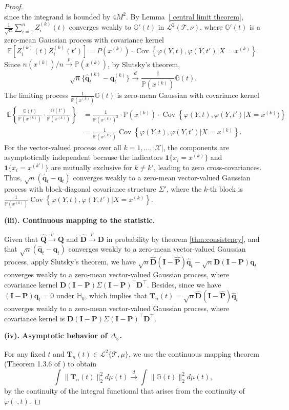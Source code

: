 \documentclass[
  12pt]{article}
\def\D{\mathbf{D}}
\def\I{\mathbf{I}}
\def\P{\mathbf{P}}
\def\Q{\mathbf{Q}}
\def\q{\mathbf{q}}
\def\T{\mathbf{T}}
\def\wh{\widehat}
\def\cL{\mathcal{L}}
\def\cT{\mathcal{T}}
\begin{document}
\begin{proof}
$$$$
since the integrand is bounded by $4M^2$. By Lemma~\ref{ central limit theorem}, $\frac{1}{\sqrt{n}} \sum_{i=1}^n Z_i^{(k)}(t)$ converges weakly to $\mathbb{G}'(t)$ in $\cL^2(\cT, \nu)$, where $\mathbb{G}'(t)$ is a zero-mean Gaussian process with covariance kernel
$$
\mathbb{E}[Z_i^{(k)}(t) Z_i^{(k)}(t')] = P(x^{(k)}) \cdot \operatorname{Cov}\left\{ \varphi(Y, t), \varphi(Y, t') | X = x^{(k)} \right\}.
$$
Since $n(x^{(k)})/n \xrightarrow{p} \mathbb{P}(x^{(k)})$, by Slutsky's theorem,
$$
\sqrt{n}\{\wh{\q}^{(k)}_t-\q^{(k)}_t\} \xrightarrow{d} \frac{1}{\mathbb{P}(x^{(k)})} \mathbb{G}(t).
$$
The limiting process $\frac{1}{\mathbb{P}(x^{(k)})} \mathbb{G}(t)$ is zero-mean Gaussian with covariance kernel
\begin{align*}
    \mathbb{E}\left\{ \frac{\mathbb{G}(t)}{\mathbb{P}(x^{(k)})} \cdot \frac{\mathbb{G}(t')}{\mathbb{P}(x^{(k)})} \right\} &= \frac{1}{\mathbb{P}(x^{(k)})^2} \cdot \mathbb{P}(x^{(k)}) \cdot \operatorname{Cov}\left\{ \varphi(Y, t), \varphi(Y, t') | X = x^{(k)}) \right\} \\
    &= \frac{1}{\mathbb{P}(x^{(k)})} \operatorname{Cov} \left\{ \varphi(Y, t), \varphi(Y, t') | X = x^{(k)} \right\}.
\end{align*}
For the vector-valued process over all $k = 1, ..., |\mathcal{X}|$, the components are asymptotically independent because the indicators $\mathbf{1}\{x_i = x^{(k)}\}$ and $\mathbf{1}\{x_i = x^{(k')}\}$ are mutually exclusive for $k \neq k'$, leading to zero cross-covariances. Thus, $\sqrt{n} (\wh{\q}_t - \q_t)$ converges weakly to a zero-mean vector-valued Gaussian process with block-diagonal covariance structure $\Sigma'$, where the $k$-th block is $\frac{1}{\mathbb{P}(x^{(k)})} \operatorname{Cov}\left\{\varphi(Y, t), \varphi(Y, t') | X = x^{(k)} \right\}$.

\noindent\textbf{(iii). Continuous mapping to the statistic.}

Given that $\wh{\Q}\xrightarrow{p} \Q$ and $\wh{\D}\xrightarrow{p} \D$ in probability by theorem \ref{thm:consistency}, and that $\sqrt{n} (\wh{\q}_t - \q_t)$ converges weakly to a zero-mean vector-valued Gaussian process, apply Slutsky’s theorem, we
have $\sqrt{n}\wh{\D}(\I-\wh{\P})\wh{\q}_t-\sqrt{n}\D(\I-\P)\q_t$ converges weakly to a zero-mean vector-valued Gaussian process, where covariance kernel $\D(\I-\P)\Sigma(\I-\P)^\top \D^\top $. Besides, since we have $(\I-\P)\q_t=0$ under $\mathbb{H}_0$, which implies that $\T_n(t)=\sqrt{n}\wh{\D}(\I-\wh{\P})\wh{\q}_t$ converges weakly to a zero-mean vector-valued Gaussian process, where covariance kernel is $\D(\I-\P)\Sigma(\I-\P)^\top \D^\top $.

\noindent\textbf{(iv). Asymptotic behavior of $\Delta_{\varphi}$.}

For any fixed $t$ and $\T_n(t)\in \cL^2\{\cT, \mu \}$, we use the continuous mapping theorem (Theorem 1.3.6 of \cite{wellner2013weak}) to obtain 
$$
\int{\|\T_n(t)\|_2^2d\mu(t)}\xrightarrow{d}\int{\|\mathbb{G} (t)\|_2^2d\mu(t)},
$$
by the continuity of the integral functional that arises from the continuity of $\varphi(\cdot,t)$.
\end{proof}
\end{document}
